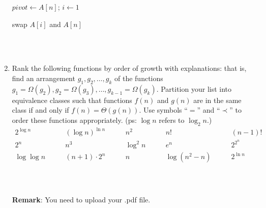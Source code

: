 \documentclass{article}
\begin{document}
\begin{enumerate}
\begin{minipage}[t]{0.8\textwidth}
\begin{algorithm}[H]
      $pivot \leftarrow A[n]$; $i \leftarrow 1$\;

      swap $A[i]$ and $A[n]$\;
    \end{algorithm}
    \end{minipage}
    
~\\
~\\
\newpage
\item Rank the following functions by order of growth with explanations: that is, find an arrangement $g_1, g_2, \ldots , g_{k}$ of the functions $g_1 = \Omega(g_2), g_2 = \Omega(g_3), \ldots, g_{k-1} = \Omega(g_{k})$.  Partition your list into equivalence classes such that functions $f(n)$ and $g(n)$ are in the same class if and only if $f(n) = \Theta(g(n))$. Use symbols ``$=$'' and ``$\prec$'' to order these functions appropriately. (ps: $\log n$ refers to $\log_2 n$.)
    $$
    \begin{array}{ccccc}
        2^{\log n} \quad & \quad (\log n)^{\ln n} \quad & \quad n^2 \quad & \quad n! \quad & \quad (n - 1)! \\
        2^n \quad & \quad n^3 \quad & \quad \log^2 n \quad & \quad e^n \quad & \quad 2^{2^n} \\
        \log\log n \quad & \quad (n+1)\cdot 2^n \quad & \quad n \quad & \quad \log {(n^2 - n)} \quad & \quad 2^{\ln n} \\
    \end{array}
    $$
    
~\\
~\\


\textbf{Remark}: You need to upload your .pdf file.
\end{enumerate}
\end{document}
